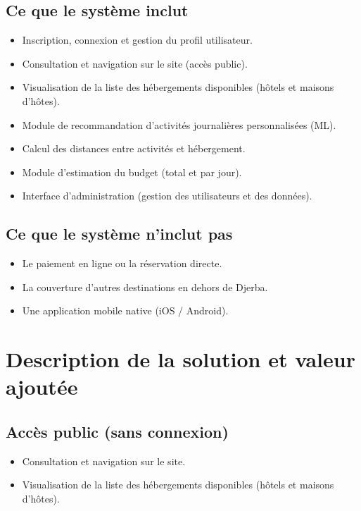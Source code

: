 \documentclass[12pt,a4paper]{report}
\begin{document}
\section{Ce que le système inclut}

\begin{itemize}
  \item Inscription, connexion et gestion du profil utilisateur.
  \item Consultation et navigation sur le site (accès public).
  \item Visualisation de la liste des hébergements disponibles (hôtels et
        maisons d'hôtes).
  \item Module de recommandation d'activités journalières personnalisées (ML).
  \item Calcul des distances entre activités et hébergement.
  \item Module d'estimation du budget (total et par jour).
  \item Interface d'administration (gestion des utilisateurs et des données).
\end{itemize}

\section{Ce que le système n'inclut pas}

\begin{itemize}
  \item Le paiement en ligne ou la réservation directe.
  \item La couverture d'autres destinations en dehors de Djerba.
  \item Une application mobile native (iOS / Android).
\end{itemize}

\chapter{Description de la solution et valeur ajoutée}

\section{Accès public (sans connexion)}

\begin{itemize}
  \item Consultation et navigation sur le site.
  \item Visualisation de la liste des hébergements disponibles (hôtels et
        maisons d'hôtes).
\end{itemize}
\end{document}
